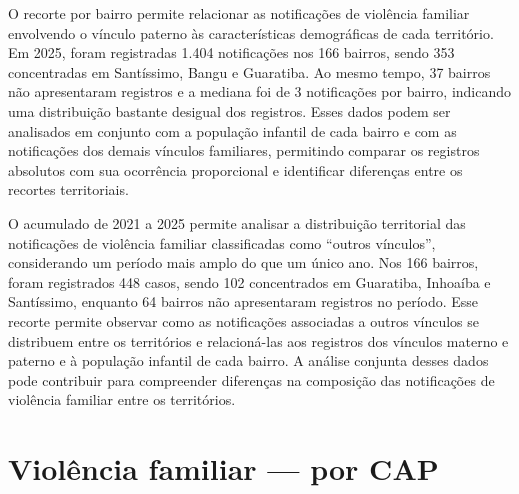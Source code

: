 
O recorte por bairro permite relacionar as notificações de violência familiar envolvendo o vínculo paterno às características demográficas de cada território. Em 2025, foram registradas 1.404 notificações nos 166 bairros, sendo 353 concentradas em Santíssimo, Bangu e Guaratiba. Ao mesmo tempo, 37 bairros não apresentaram registros e a mediana foi de 3 notificações por bairro, indicando uma distribuição bastante desigual dos registros. Esses dados podem ser analisados em conjunto com a população infantil de cada bairro e com as notificações dos demais vínculos familiares, permitindo comparar os registros absolutos com sua ocorrência proporcional e identificar diferenças entre os recortes territoriais.


O acumulado de 2021 a 2025 permite analisar a distribuição territorial das notificações de violência familiar classificadas como “outros vínculos”, considerando um período mais amplo do que um único ano. Nos 166 bairros, foram registrados 448 casos, sendo 102 concentrados em Guaratiba, Inhoaíba e Santíssimo, enquanto 64 bairros não apresentaram registros no período. Esse recorte permite observar como as notificações associadas a outros vínculos se distribuem entre os territórios e relacioná-las aos registros dos vínculos materno e paterno e à população infantil de cada bairro. A análise conjunta desses dados pode contribuir para compreender diferenças na composição das notificações de violência familiar entre os territórios.


\section{Violência familiar — por CAP}

